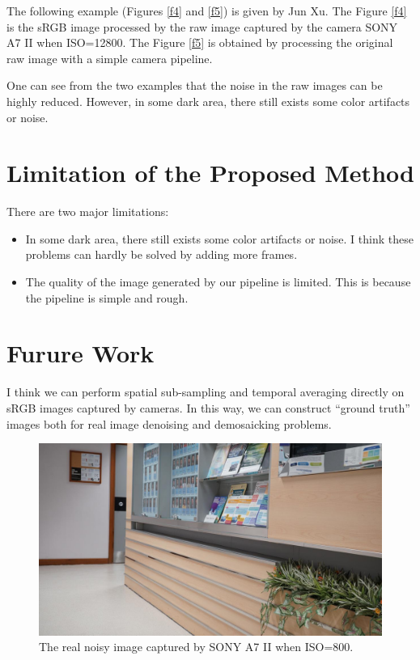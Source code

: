 \documentclass[10pt,twocolumn,letterpaper]{article}
\begin{document}
The following example (Figures \ref{f4} and \ref{f5}) is given by Jun Xu. The 
Figure \ref{f4} is the sRGB image processed by the raw image captured by the camera SONY A7 II when ISO=12800. The Figure \ref{f5} is obtained by processing the original raw image with a simple camera pipeline.

One can see from the two examples that the noise in the raw images can be highly reduced. However, in some dark area, there still exists some color artifacts or noise. 

\section{Limitation of the Proposed Method}
There are two major limitations:
\begin{itemize}
\item In some dark area, there still exists some color artifacts or noise. I think these problems can hardly be solved by adding more frames. 
\item The quality of the image generated by our pipeline is limited. This is because the pipeline is simple and rough. 
\end{itemize}

\section{Furure Work}

I think we can perform spatial sub-sampling and temporal averaging directly on sRGB images captured by cameras. In this way, we can construct ``ground truth'' images both for real image denoising and demosaicking problems.


\begin{figure}
\centering
\includegraphics[width=0.8\linewidth]{resize_DSC01764.JPG}
\caption{The real noisy image captured by SONY A7 II when ISO=800.
}
\label{f2}
\end{figure}
\end{document}

